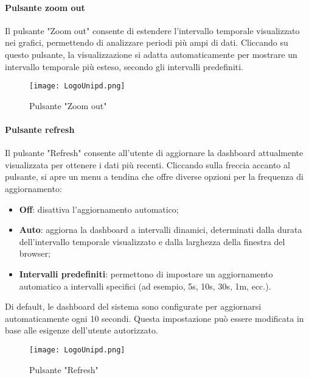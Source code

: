 \documentclass[10pt]{article}
\begin{document}
\begin{justify}
    \paragraph{Pulsante zoom out}
    Il pulsante "Zoom out" consente di estendere l'intervallo temporale visualizzato nei grafici, permettendo di analizzare periodi più ampi di dati. Cliccando su questo pulsante, la visualizzazione si adatta automaticamente per mostrare un intervallo temporale più esteso, secondo gli intervalli predefiniti.
    \begin{figure}[H]
    \centering
    \texttt{[image: LogoUnipd.png]}
    \caption{Pulsante "Zoom out"}
    \end{figure}
    
    \paragraph{Pulsante refresh}
    Il pulsante "Refresh" consente all'utente di aggiornare la dashboard attualmente visualizzata per ottenere i dati più recenti. Cliccando sulla freccia accanto al pulsante, si apre un menu a tendina che offre diverse opzioni per la frequenza di aggiornamento:
    \begin{itemize}
        \item \textbf{Off}: disattiva l'aggiornamento automatico;
        \item \textbf{Auto}: aggiorna la dashboard a intervalli dinamici, determinati dalla durata dell'intervallo temporale visualizzato e dalla larghezza della finestra del browser;
        \item \textbf{Intervalli predefiniti}: permettono di impostare un aggiornamento automatico a intervalli specifici (ad esempio, 5s, 10s, 30s, 1m, ecc.).
    \end{itemize}
    Di default, le dashboard del sistema sono configurate per aggiornarsi automaticamente ogni 10 secondi. Questa impostazione può essere modificata in base alle esigenze dell'utente autorizzato.
    \begin{figure}[H]
    \centering
    \texttt{[image: LogoUnipd.png]}
    \caption{Pulsante "Refresh"}
    \end{figure}



\end{justify}
\end{document}
